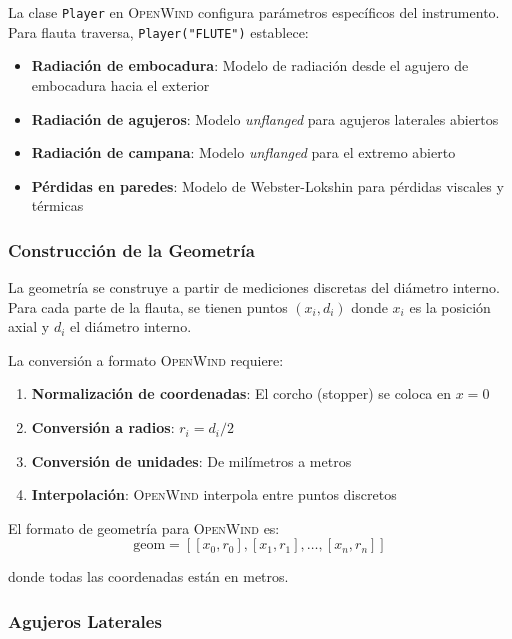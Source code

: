 \documentclass[12pt,a4paper,twocolumn]{article}
\newcommand{\openwind}{\textsc{OpenWind}}
\begin{document}
La clase \texttt{Player} en \openwind{} configura parámetros específicos del instrumento. Para flauta traversa, \texttt{Player("FLUTE")} establece:

\begin{itemize}
    \item \textbf{Radiación de embocadura}: Modelo de radiación desde el agujero de embocadura hacia el exterior
    \item \textbf{Radiación de agujeros}: Modelo \textit{unflanged} para agujeros laterales abiertos
    \item \textbf{Radiación de campana}: Modelo \textit{unflanged} para el extremo abierto
    \item \textbf{Pérdidas en paredes}: Modelo de Webster-Lokshin para pérdidas viscales y térmicas
\end{itemize}

\subsubsection{Construcción de la Geometría}

La geometría se construye a partir de mediciones discretas del diámetro interno. Para cada parte de la flauta, se tienen puntos $(x_i, d_i)$ donde $x_i$ es la posición axial y $d_i$ el diámetro interno.

La conversión a formato \openwind{} requiere:
\begin{enumerate}
    \item \textbf{Normalización de coordenadas}: El corcho (stopper) se coloca en $x=0$
    \item \textbf{Conversión a radios}: $r_i = d_i/2$
    \item \textbf{Conversión de unidades}: De milímetros a metros
    \item \textbf{Interpolación}: \openwind{} interpola entre puntos discretos
\end{enumerate}

El formato de geometría para \openwind{} es:
\begin{equation}
\text{geom} = [[x_0, r_0], [x_1, r_1], \ldots, [x_n, r_n]]
\label{eq:geometria_openwind}
\end{equation}

donde todas las coordenadas están en metros.

\subsubsection{Agujeros Laterales}
\end{document}
